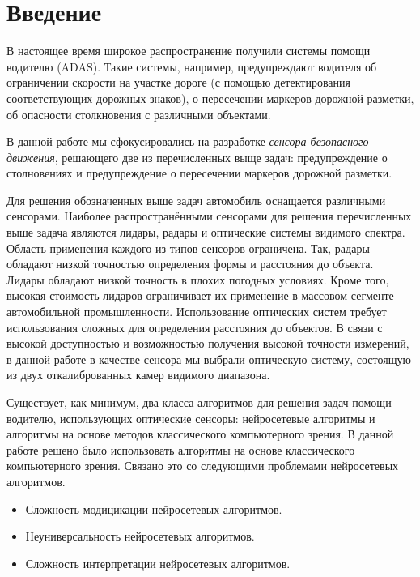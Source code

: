 \documentclass[aps,%
14pt,%
final,%
oneside,
onecolumn,%
musixtex, %
superscriptaddress,%
centertags]{extarticle} %
\begin{document}
\tableofcontents

\section*{Введение}




В настоящее время широкое распространение получили системы помощи водителю (ADAS). Такие системы, например, предупреждают водителя об ограничении скорости на участке дороге (с помощью детектирования соответствующих дорожных знаков), о пересечении маркеров дорожной разметки, об опасности столкновения с различными объектами.

В данной работе мы сфокусировались на разработке \textit{сенсора безопасного движения}, решающего две из перечисленных выще задач: предупреждение о столновениях и предупреждение о пересечении маркеров дорожной разметки. 

Для решения обозначенных выше задач автомобиль оснащается различными сенсорами. Наиболее распространёнными сенсорами для решения перечисленных выше задача являются лидары, радары и оптические системы видимого спектра. Область применения каждого из типов сенсоров ограничена. Так, радары обладают низкой точностью определения формы и расстояния до объекта. Лидары обладают низкой точность в плохих погодных условиях. Кроме того, высокая стоимость лидаров ограничивает их применение в массовом сегменте автомобильной промышленности. Использование оптических систем требует использования сложных для определения расстояния до объектов. В связи с высокой доступностью и возможностью получения высокой точности измерений, в данной работе в качестве сенсора мы выбрали оптическую систему, состоящую из двух откалиброванных камер видимого диапазона.

Существует, как минимум, два класса алгоритмов для решения задач помощи водителю, использующих оптические сенсоры: нейросетевые алгоритмы и алгоритмы на основе методов классического компьютерного зрения. В данной работе решено было использовать алгоритмы на основе классического компьютерного зрения. Связано это со следующими проблемами нейросетевых алгоритмов.
\begin{itemize}
\item Сложность модицикации нейросетевых алгоритмов.
\item Неуниверсальность нейросетевых алгоритмов.
\item Сложность интерпретации нейросетевых алгоритмов.
\end{itemize}
\end{document}
